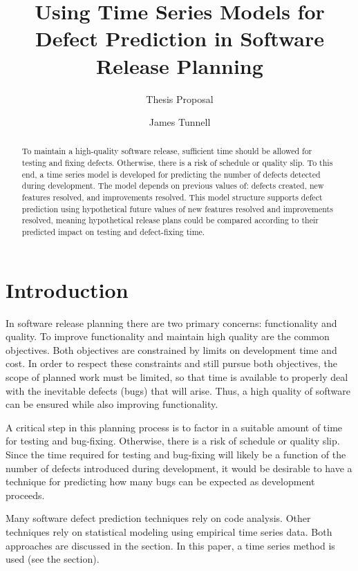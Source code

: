 \documentclass[a4paper]{scrartcl}
\begin{document}
\title{Using Time Series Models for Defect Prediction in Software Release Planning}
\subtitle{Thesis Proposal}
\author{James Tunnell}
\maketitle

\begin{abstract}
To maintain a high-quality software release, sufficient time should be allowed for testing and fixing defects. Otherwise, there is a risk of schedule or quality slip. To this end, a time series model is developed for predicting the number of defects detected during development. The model depends on previous values of: defects created, new features resolved, and improvements resolved. This model structure supports defect prediction using hypothetical future values of new features resolved and improvements resolved, meaning hypothetical release plans could be compared according to their predicted impact on testing and defect-fixing time.
\end{abstract}

\section*{Introduction}
In software release planning there are two primary concerns: functionality and quality. To improve functionality and maintain high quality are the common objectives. Both objectives are constrained by limits on development time and cost. In order to respect these constraints and still pursue both objectives, the scope of planned work must be limited, so that time is available to properly deal with the inevitable defects (bugs) that will arise. Thus, a high quality of software can be ensured while also improving functionality.

A critical step in this planning process is to factor in a suitable amount of time for testing and bug-fixing. Otherwise, there is a risk of schedule or quality slip. Since the time required for testing and bug-fixing will likely be a function of the number of defects introduced during development, it would be desirable to have a technique for predicting how many bugs can be expected as development proceeds.

Many software defect prediction techniques rely on code analysis. Other techniques rely on statistical modeling using empirical time series data. Both approaches are discussed in the  section. In this paper, a time series method is used (see the  section).
\end{document}
